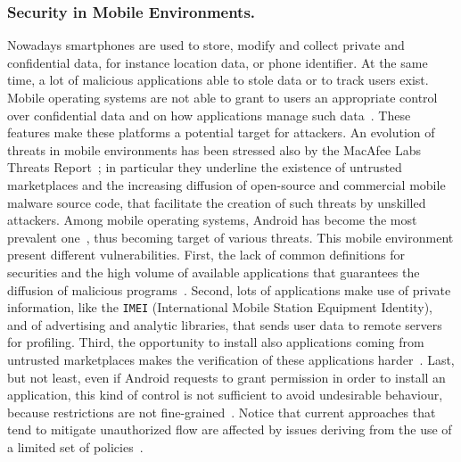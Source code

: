 \documentclass{llncs}
\begin{document}
\subsubsection{Security in Mobile Environments.}
Nowadays smartphones are used to store, modify and collect private and confidential data, for instance location data, or phone identifier. At the same time, a lot of malicious applications able to stole data or to track users exist. Mobile operating systems are not able to grant to users an appropriate control over confidential data and on how applications manage such data~\cite{Enck:2014:TIT:2642648.2619091}. These features make these platforms a potential target for attackers. An evolution of threats in mobile environments has been stressed also by the MacAfee Labs Threats Report~\cite{McAfee_threat}; in particular they underline the existence of untrusted marketplaces and the increasing diffusion of open-source and commercial mobile malware source code, that facilitate the creation of such threats by unskilled attackers.
Among mobile operating systems, Android has become the most prevalent one~\cite{idc_phonetrack}, thus becoming target of various threats. This mobile environment present different vulnerabilities. First, the lack of common definitions for securities and the high volume of available applications that guarantees the diffusion of malicious programs~\cite{Enck11astudy}. Second, lots of applications make use of private information, like the \texttt{IMEI} (International Mobile Station Equipment Identity), and of advertising and analytic libraries, that sends user data to remote servers for profiling. Third, the opportunity to install also applications coming from untrusted marketplaces makes the verification of these applications harder~\cite{TUD-CS-2014-0849}. Last, but not least, even if Android requests to grant permission in order to install an application, this kind of control is not sufficient to avoid undesirable behaviour, because restrictions are not fine-grained~\cite{fritz2013highly, Hornyack:2011:TAD:2046707.2046780}. Notice that current approaches that tend to mitigate unauthorized flow are affected by issues deriving from the use of a limited set of policies~\cite{TUD-CS-2014-0849}.
\end{document}
